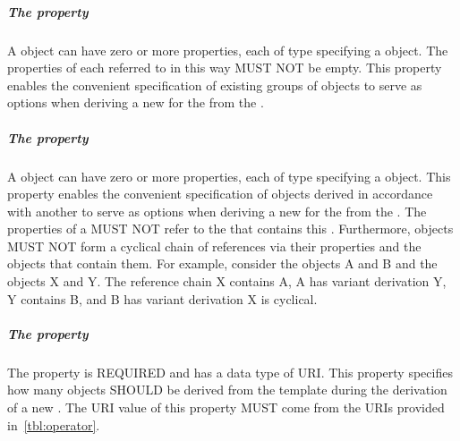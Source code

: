 \subparagraph{The  property}\label{sec:variantCollection}

A  object can have zero or more  properties, each of type  specifying a  object.  The  properties of each  referred to in this way MUST NOT be empty. This property enables the convenient specification of existing groups of  objects to serve as options when deriving a new  for the   from the .

\subparagraph{The  property}\label{sec:variantDerivation}

A  object can have zero or more  properties, each of type  specifying a  object. This property enables the convenient specification of  objects derived in accordance with another  to serve as options when deriving a new  for the   from the . The  properties of a  MUST NOT refer to the  that contains this . Furthermore,  objects MUST NOT form a cyclical chain of references via their  properties and the  objects that contain them. For example, consider the  objects A and B and the  objects X and Y. The reference chain X contains A, A has variant derivation Y, Y contains B, and B has variant derivation X is cyclical.

\subparagraph{The  property}\label{sec:operator}

The  property is REQUIRED and has a data type of URI. This property specifies how many  objects SHOULD be derived from the template  during the derivation of a new . The URI value of this property MUST come from the URIs provided in~\ref{tbl:operator}.

